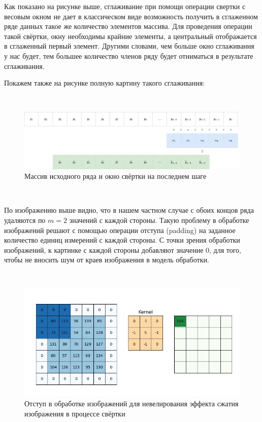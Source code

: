 \documentclass[
]{article}
\begin{document}
Как показано на рисунке выше, сглаживание при помощи операции свертки с
весовым окном не дает в классическом виде возможность получить в
сглаженном ряде данных такое же количество элементов массива. Для
проведения операции такой свёртки, окну необходимы крайние элементы, а
центральный отображается в сглаженный первый элемент. Другими словами,
чем больше окно сглаживания у нас будет, тем большее количество членов
ряду будет отниматься в результате сглаживания.

Покажем также на рисунке полную картину такого сглаживания:

\(\ \)

\begin{figure}
\centering
\includegraphics{Statistics-Свёртка2.drawio.png}
\caption{Массив исходного ряда и окно свёртки на последнем шаге}
\end{figure}

\(\ \)

По изображению выше видно, что в нашем частном случае с обоих концов
ряда удаляются по \(m = 2\) значений с каждой стороны. Такую проблему в
обработке изображений решают с помощью операции отступа (padding) на
заданное количество единиц измерений с каждой стороны. С точки зрения
обработки изображений, к картинке с каждой стороны добавляют значение
\(0\), для того, чтобы не вносить шум от краев изображения в модель
обработки.

\(\ \)

\begin{figure}
\centering
\includegraphics{padding_conv2d.jpeg}
\caption{Отступ в обработке изображений для невелирования эффекта сжатия
изображения в процессе свёртки}
\end{figure}
\end{document}
